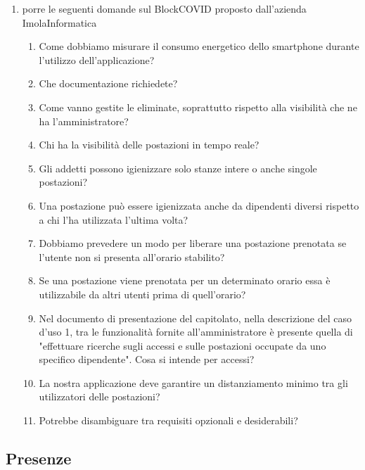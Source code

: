 \begin{enumerate}
	\item porre le seguenti domande sul  BlockCOVID proposto dall'azienda \mbox{ImolaInformatica}
	\begin{enumerate}
		\item Come dobbiamo misurare il consumo energetico dello smartphone durante l'utilizzo dell'applicazione?
		
		\item Che documentazione richiedete?
		
		\item Come vanno gestite le  eliminate, soprattutto rispetto alla visibilità che ne ha l'amministratore?
		
		\item Chi ha la visibilità delle postazioni in tempo reale?
		
		\item Gli addetti possono igienizzare solo stanze intere o anche singole postazioni?
		
		\item Una postazione può essere igienizzata anche da dipendenti diversi rispetto a chi l'ha utilizzata l'ultima volta?
		
		\item Dobbiamo prevedere un modo per liberare una postazione prenotata se l'utente non si presenta all'orario stabilito?
		
		\item Se una postazione viene prenotata per un determinato orario essa è utilizzabile da altri utenti prima di quell'orario?
		
		\item Nel documento di presentazione del capitolato, nella descrizione del caso d'uso 1, tra le funzionalità fornite all'amministratore è presente quella di "effettuare ricerche sugli accessi e sulle postazioni occupate da uno specifico dipendente". Cosa si intende per accessi?
		
		\item La nostra applicazione deve garantire un distanziamento minimo tra gli utilizzatori delle postazioni?
		
		\item Potrebbe disambiguare tra requisiti opzionali e desiderabili?
		
	\end{enumerate}
\end{enumerate}

\subsection*{Presenze}

